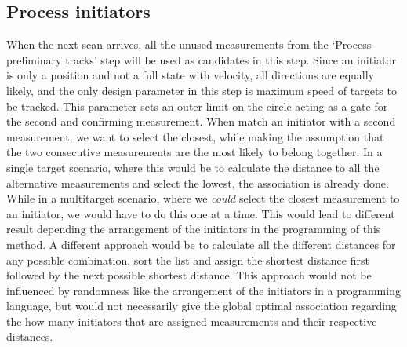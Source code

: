 \subsection{Process initiators}
When the next scan arrives, all the unused measurements from the `Process preliminary tracks' step will be used as candidates in this step. Since an initiator is only a position and not a full state with velocity, all directions are equally likely, and the only design parameter in this step is maximum speed of targets to be tracked. This parameter sets an outer limit on the circle acting as a gate for the second and confirming measurement. When match an initiator with a second measurement, we want to select the closest, while making the assumption that the two consecutive measurements are the most likely to belong together. In a single target scenario, where this would be to calculate the distance to all the alternative measurements and select the lowest, the association is already done. While in a multitarget scenario, where we \emph{could} select the closest measurement to an initiator, we would have to do this one at a time. This would lead to different result depending the arrangement of the initiators in the programming of this method. A different approach would be to calculate all the different distances for any possible combination, sort the list and assign the shortest distance first followed by the next possible shortest distance. This approach would not be influenced by randomness like the arrangement of the initiators in a programming language, but would not necessarily give the global optimal association regarding the how many initiators that are assigned measurements and their respective distances.

